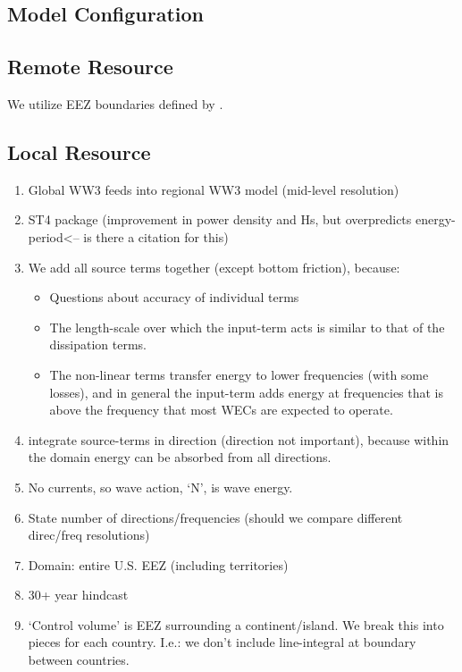 \subsection{Model Configuration}

\subsection{Remote Resource}

We utilize EEZ boundaries defined by \citep[]{flandersmarineinstituteMaritimeBoundariesGeodatabase}.

\subsection{Local Resource}

\begin{enumerate}
\item Global WW3 feeds into regional WW3 model (mid-level resolution)
\item ST4 package (improvement in power density and Hs, but overpredicts energy-period<-- is there a citation for this)
\item We add all source terms together (except bottom friction), because:
  \begin{itemize}
  \item Questions about accuracy of individual terms \citep{garcia-medinaWaveResourceAssessment2014}
  \item The length-scale over which the input-term acts is similar to that of the dissipation terms.
  \item The non-linear terms transfer energy to lower frequencies (with some losses), and in general the input-term adds energy at frequencies that is above the frequency that most WECs are expected to operate. 
  \end{itemize}
\item integrate source-terms in direction (direction not important), because within the domain energy can be absorbed from all directions.
\item No currents, so wave action, ‘N’, is wave energy.
\item State number of directions/frequencies (should we compare different direc/freq resolutions)
\item Domain: entire U.S. EEZ (including territories)
\item 30+ year hindcast
\item ‘Control volume’ is EEZ surrounding a continent/island. We break this into pieces for each country. I.e.: we don’t include line-integral at boundary between countries.

\end{enumerate}
